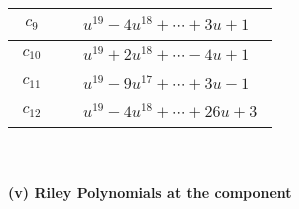 \documentclass[1p]{elsarticle_modified}
\theoremstyle{definition}
\begin{document}
\begin{tabular}{m{50pt}|m{274pt}}
\hline $$\begin{aligned}c_{9}\end{aligned}$$&$\begin{aligned}
&u^{19}-4 u^{18}+\cdots+3 u+1
\end{aligned}$\\
\hline $$\begin{aligned}c_{10}\end{aligned}$$&$\begin{aligned}
&u^{19}+2 u^{18}+\cdots-4 u+1
\end{aligned}$\\
\hline $$\begin{aligned}c_{11}\end{aligned}$$&$\begin{aligned}
&u^{19}-9 u^{17}+\cdots+3 u-1
\end{aligned}$\\
\hline $$\begin{aligned}c_{12}\end{aligned}$$&$\begin{aligned}
&u^{19}-4 u^{18}+\cdots+26 u+3
\end{aligned}$\\
\hline
\end{tabular}\\~\\
\newpage\renewcommand{\arraystretch}{1}
\flushleft \textbf{(v) Riley Polynomials at the component}\newline \\
\end{document}
